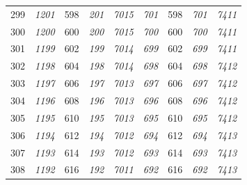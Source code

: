 \documentclass[10pt,fleqn]{article}
\begin{document}
\begin{longtable}{c|cccccccc}
299 & {\color{blue} \it 1201 \rm} & {\color{black} 598} & {\color{blue} \it 201 \rm} & {\color{blue} \it 7015 \rm} & {\color{blue} \it 701 \rm} & {\color{black} 598} & {\color{blue} \it 701 \rm} & {\color{blue} \it 7411 \rm} \\
300 & {\color{blue} \it 1200 \rm} & {\color{black} 600} & {\color{blue} \it 200 \rm} & {\color{blue} \it 7015 \rm} & {\color{blue} \it 700 \rm} & {\color{black} 600} & {\color{blue} \it 700 \rm} & {\color{blue} \it 7411 \rm} \\
301 & {\color{blue} \it 1199 \rm} & {\color{black} 602} & {\color{blue} \it 199 \rm} & {\color{blue} \it 7014 \rm} & {\color{blue} \it 699 \rm} & {\color{black} 602} & {\color{blue} \it 699 \rm} & {\color{blue} \it 7411 \rm} \\
302 & {\color{blue} \it 1198 \rm} & {\color{black} 604} & {\color{blue} \it 198 \rm} & {\color{blue} \it 7014 \rm} & {\color{blue} \it 698 \rm} & {\color{black} 604} & {\color{blue} \it 698 \rm} & {\color{blue} \it 7412 \rm} \\
303 & {\color{blue} \it 1197 \rm} & {\color{black} 606} & {\color{blue} \it 197 \rm} & {\color{blue} \it 7013 \rm} & {\color{blue} \it 697 \rm} & {\color{black} 606} & {\color{blue} \it 697 \rm} & {\color{blue} \it 7412 \rm} \\
304 & {\color{blue} \it 1196 \rm} & {\color{black} 608} & {\color{blue} \it 196 \rm} & {\color{blue} \it 7013 \rm} & {\color{blue} \it 696 \rm} & {\color{black} 608} & {\color{blue} \it 696 \rm} & {\color{blue} \it 7412 \rm} \\
305 & {\color{blue} \it 1195 \rm} & {\color{black} 610} & {\color{blue} \it 195 \rm} & {\color{blue} \it 7013 \rm} & {\color{blue} \it 695 \rm} & {\color{black} 610} & {\color{blue} \it 695 \rm} & {\color{blue} \it 7412 \rm} \\
306 & {\color{blue} \it 1194 \rm} & {\color{black} 612} & {\color{blue} \it 194 \rm} & {\color{blue} \it 7012 \rm} & {\color{blue} \it 694 \rm} & {\color{black} 612} & {\color{blue} \it 694 \rm} & {\color{blue} \it 7413 \rm} \\
307 & {\color{blue} \it 1193 \rm} & {\color{black} 614} & {\color{blue} \it 193 \rm} & {\color{blue} \it 7012 \rm} & {\color{blue} \it 693 \rm} & {\color{black} 614} & {\color{blue} \it 693 \rm} & {\color{blue} \it 7413 \rm} \\
308 & {\color{blue} \it 1192 \rm} & {\color{black} 616} & {\color{blue} \it 192 \rm} & {\color{blue} \it 7011 \rm} & {\color{blue} \it 692 \rm} & {\color{black} 616} & {\color{blue} \it 692 \rm} & {\color{blue} \it 7413 \rm} \\

\end{longtable}
\end{document}
